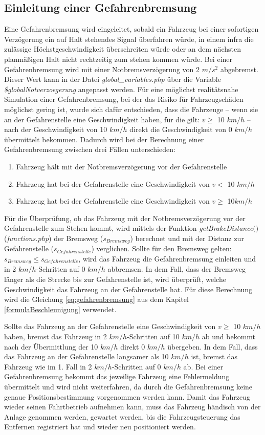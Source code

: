 \subsection{Einleitung einer Gefahrenbremsung} \label{notbremsung}
Eine Gefahrenbremsung wird eingeleitet, sobald ein Fahrzeug bei einer sofortigen Verzögerung ein auf Halt stehendes Signal überfahren würde, in einem \ac{infra} die zulässige Höchstgeschwindigkeit überschreiten würde oder an dem nächsten planmäßigen Halt nicht rechtzeitig zum stehen kommen würde. Bei einer Gefahrenbremsung wird mit einer Notbremsverzögerung von 2 $m/s^2$ abgebremst. Dieser Wert kann in der Datei \textit{global\_variables.php} über die Variable \textit{\$globalNotverzoegerung} angepasst werden. Für eine möglichst realitätsnahe Simulation einer Gefahrenbremsung, bei der das Risiko für Fahrzeugschäden möglichst gering ist, wurde sich dafür entschieden, dass die Fahrzeuge -- wenn sie an der Gefahrenstelle eine Geschwindigkeit haben, für die gilt: $v\geq$ 10 $km/h$ -- nach der Geschwindigkeit von 10 $km/h$ direkt die Geschwindigkeit von 0 $km/h$ übermittelt bekommen. Dadurch wird bei der Berechnung einer Gefahrenbremsung zwischen drei Fällen unterschieden:
\begin{enumerate}
\item Fahrzeug hält mit der Notbremsverzögerung vor der Gefahrenstelle
\item Fahrzeug hat bei der Gefahrenstelle eine Geschwindigkeit von $v<$ 10 $km/h$
\item Fahrzeug hat bei der Gefahrenstelle eine Geschwindigkeit von $v\geq$ 10$ km/h$
\end{enumerate}
Für die Überprüfung, ob das Fahrzeug mit der Notbremsverzögerung vor der Gefahrenstelle zum Stehen kommt, wird mittels der Funktion \textit{getBrakeDistance$($$)$} (\textit{functions.php}) der Bremsweg ($s_{Bremsweg}$) berechnet und mit der Distanz zur Gefahrenstelle ($s_{Gefahrenstelle}$) verglichen. Sollte für den Bremsweg gelten: $s_{Bremsweg}\leq s_{Gefahrenstelle}$, wird das Fahrzeug die Gefahrenbremsung einleiten und in 2 $km/h$-Schritten auf 0 $km/h$ abbremsen. In dem Fall, dass der Bremsweg länger als die Strecke bis zur Gefahrenstelle ist, wird überprüft, welche Geschwindigkeit das Fahrzeug an der Gefahrenstelle hat. Für diese Berechnung wird die Gleichung \ref{eq:gefahrenbremsung} aus dem Kapitel \ref{formulaBeschleunigung} verwendet. 

Sollte das Fahrzeug an der Gefahrenstelle eine Geschwindigkeit von $v\geq$ 10 $km/h$ haben, bremst das Fahrzeug in 2 $km/h$-Schritten auf 10 $km/h$ ab und bekommt nach der Übermittlung der 10 $km/h$ direkt 0 $km/h$ übergeben. In dem Fall, dass das Fahrzeug an der Gefahrenstelle langsamer als 10 $km/h$ ist, bremst das Fahrzeug wie im 1. Fall in 2 $km/h$-Schritten auf 0 $km/h$ ab. Bei einer Gefahrenbremsung bekommt das jeweilige Fahrzeug eine Fehlermeldung übermittelt und wird nicht weiterfahren, da durch die Gefahrenbremsung keine genaue Positionsbestimmung vorgenommen werden kann. Damit das Fahrzeug wieder seinen Fahrtbetrieb aufnehmen kann, muss das Fahrzeug händisch von der Anlage genommen werden, gewartet werden, bis die Fahrzeugsteuerung das Entfernen registriert hat und wieder neu positioniert werden.
